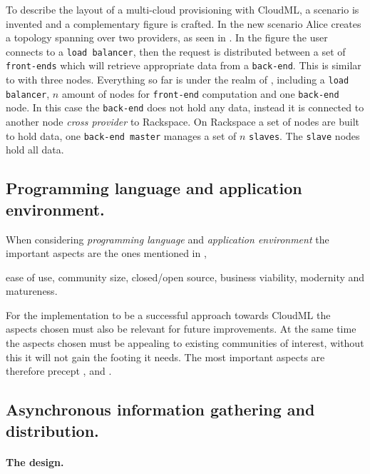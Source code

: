 To describe the layout of a multi-cloud provisioning with CloudML,
a scenario is invented and a complementary figure is crafted.
In the new scenario Alice creates a topology spanning over two providers,
as seen in .
In the figure the user connects to a \texttt{load balancer}, 
then the request is distributed between a set of \texttt{front-ends} which will 
retrieve appropriate data from a \texttt{back-end}.
This is similar to  with three nodes.
Everything so far is under the realm of ,
including a \texttt{load balancer}, $n$ amount of nodes for \texttt{front-end} computation
and one \texttt{back-end} node.
In this case the \texttt{back-end} does not hold any data, instead it is connected
to another node \emph{cross provider} to Rackspace.
On Rackspace a set of nodes are built to hold data,
one \texttt{back-end master} manages a set of $n$ \texttt{slaves}.
The \texttt{slave} nodes hold all data.


\subsection{Programming language and application environment.}

When considering \emph{programming language} and \emph{application environment} 
the important aspects are the ones mentioned in ,
\begin{ii}
  \iitem ease of use,
  \iitem community size,
  \iitem closed/open source,
  \iitem business viability,
  \iitem modernity and 
  \iitem matureness.
\end{ii}
For the implementation to be a successful approach towards CloudML 
the aspects chosen must also be relevant for future improvements.
At the same time the aspects chosen must be appealing to existing communities of interest,
without this it will not gain the footing it needs.
The most important aspects are therefore precept ,  and .

\subsection{Asynchronous information gathering and distribution.}

\paragraph{The design.}

